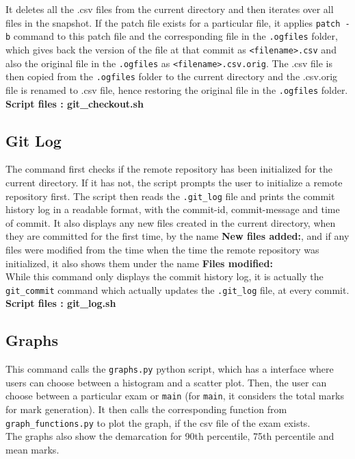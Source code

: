 \documentclass{article}
\begin{document}
It deletes all the .csv files from the current directory and then iterates over all files in the snapshot. If the patch file exists for a particular file, it applies \verb"patch -b" command to this patch file and the corresponding file in the \verb".ogfiles" folder, which gives back the version of the file at that commit as \verb"<filename>.csv" and also the original file in the \verb".ogfiles" as \verb"<filename>.csv.orig".
The .csv file is then copied from the \verb".ogfiles" folder to the current directory and the .csv.orig file is renamed to .csv file, hence restoring the original file in the \verb".ogfiles" folder.\\

\textbf{Script files : git\_checkout.sh}

\subsection{Git Log}
The command first checks if the remote repository has been initialized for the current directory. If it has not, the script prompts the user to initialize a remote repository first.
The script then reads the \verb".git_log" file and prints the commit history log in a readable format, with the commit-id, commit-message and time of commit. It also displays any new files created in the current directory, when they are committed for the first time, by the name \textbf{New files added:}, and if any files were modified from the time when the time the remote repository was initialized, it also shows them under the name \textbf{Files modified:} \\

While this command only displays the commit history log, it is actually the \verb"git_commit" command which actually updates the \verb".git_log" file, at every commit.\\

\textbf{Script files : git\_log.sh}

\subsection{Graphs}
This command calls the \verb"graphs.py" python script, which has a interface where users can choose between a histogram and a scatter plot. Then, the user can choose between a particular exam or \verb"main" (for \verb"main", it considers the total marks for mark generation). It then calls the corresponding function from \verb"graph_functions.py" to plot the graph, if the csv file of the exam exists.\\
The graphs also show the demarcation for 90th percentile, 75th percentile and mean marks.\\
\end{document}

